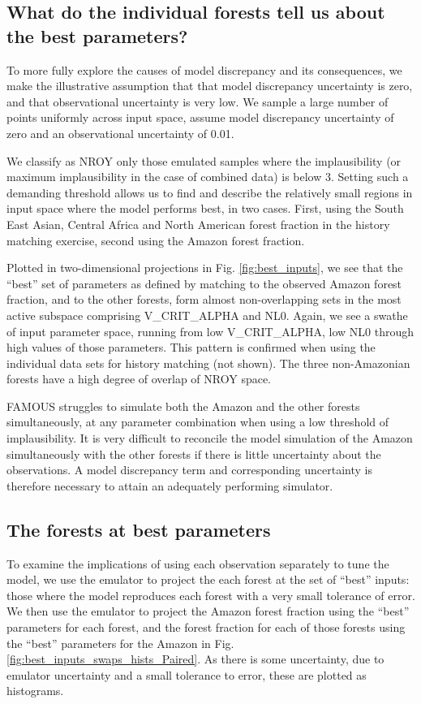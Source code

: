 \documentclass[esd, article]{copernicus} %
\begin{document}
\subsection{What do the individual forests tell us about the best parameters?}\label{ssec:learn}
To more fully explore the causes of model discrepancy and its consequences, we make the illustrative assumption that that model discrepancy uncertainty is zero, and that observational uncertainty is very low. We sample a large number of points uniformly across input space, assume model discrepancy uncertainty of zero and an observational uncertainty of 0.01.

We classify as NROY only those emulated samples where the implausibility (or maximum implausibility in the case of combined data) is below 3. Setting such a demanding threshold allows us to find and describe the relatively small regions in input space where the model performs best, in two cases. First, using the South East Asian, Central Africa and North American forest fraction in the history matching exercise, second using the Amazon forest fraction.


Plotted in two-dimensional projections in Fig.  \ref{fig:best_inputs}, we see that the ``best'' set of parameters as defined by matching to the observed Amazon forest fraction, and to the other forests, form almost non-overlapping sets in the most active subspace comprising V\_CRIT\_ALPHA and NL0. Again, we see a swathe of input parameter space, running from low V\_CRIT\_ALPHA, low NL0 through high values of those parameters. This pattern is confirmed when using the individual data sets for history matching (not shown). The three non-Amazonian forests have a high degree of overlap of NROY space.

FAMOUS struggles to simulate both the Amazon and the other forests simultaneously, at any parameter combination when using a low threshold of implausibility.  It is very difficult to reconcile the model simulation of the Amazon simultaneously with the other forests if there is little uncertainty about the observations. A model discrepancy term and corresponding uncertainty is therefore necessary to attain an adequately performing simulator.


\subsection{The forests at best parameters}\label{ssec:bestparameters}
To examine the implications of using each observation separately to tune the model, we use the emulator to project the each forest at the set of ``best'' inputs: those where the model reproduces each forest with a very small tolerance of error. We then use the emulator to project the Amazon forest fraction using the ``best'' parameters for each forest, and the forest fraction for each of those forests using the ``best'' parameters for the Amazon in Fig. \ref{fig:best_inputs_swaps_hists_Paired}. As there is some uncertainty, due to emulator uncertainty and a small tolerance to error, these are plotted as histograms.
\end{document}
